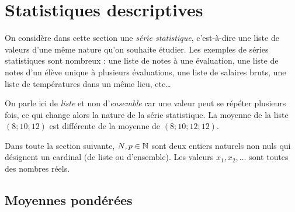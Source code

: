 
\chapter{Statistiques descriptives}
\label{chap:statistiques}


On considère dans cette section une \emph{série statistique}, c'est-à-dire une liste de valeurs d'une même nature qu'on souhaite étudier.
Les exemples de séries statistiques sont nombreux : une liste de notes à une évaluation, une liste de notes d'un élève unique à plusieurs évaluations, une liste de salaires bruts, une liste de températures dans un même lieu, etc…

On parle ici de \emph{liste} et non d'\emph{ensemble} car une valeur peut se répéter plusieurs fois, ce qui change alors la nature de la série statistique.
La moyenne de la liste $(8; 10; 12)$ est différente de la moyenne de $(8; 10; 12; 12)$.

Dans toute la section suivante, $N, p \in \mathbb{N}$ sont deux entiers naturels non nuls qui désignent un cardinal (de liste ou d'ensemble). 
Les valeurs $x_1, x_2, \dots$ sont toutes des nombres réels.


\section{Moyennes pondérées}





